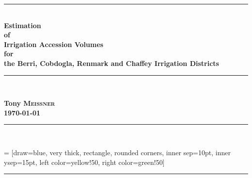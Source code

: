 \documentclass[a4paper, titlepage, 12pt]{article}\usepackage[]{graphicx}\usepackage[]{color}
\newcommand{\HRule}{\rule{\linewidth}{3.0mm}}
\begin{document}
\begin{sffamily}

\begin{titlepage}
\begin{center}

\color{blue}
\HRule \\ [0.5cm]
\color{black}
{ \huge \bfseries Estimation\\of\\Irrigation Accession Volumes\\for \\the Berri, Cobdogla, Renmark and Chaffey Irrigation Districts\\ [0.5cm]}
\color{green}
\HRule \\ [2.0cm]
\color{black}

\begin{center} \Large
\textbf{Tony \textsc{Meissner}} \\ [0.5cm]
{\large \textbf{\today}}
\end{center}

\color{white}
\HRule \\ [1.0cm]
\color{blue}
\begin{flushright}

 = [draw=blue, very thick,
  rectangle, rounded corners, inner sep=10pt, inner ysep=15pt, left color=yellow!50, right color=green!50]

\end{flushright}
\color{brown}
\HRule \\
\color{black}
\end{center}
\end{titlepage}


\end{sffamily}
\end{document}
